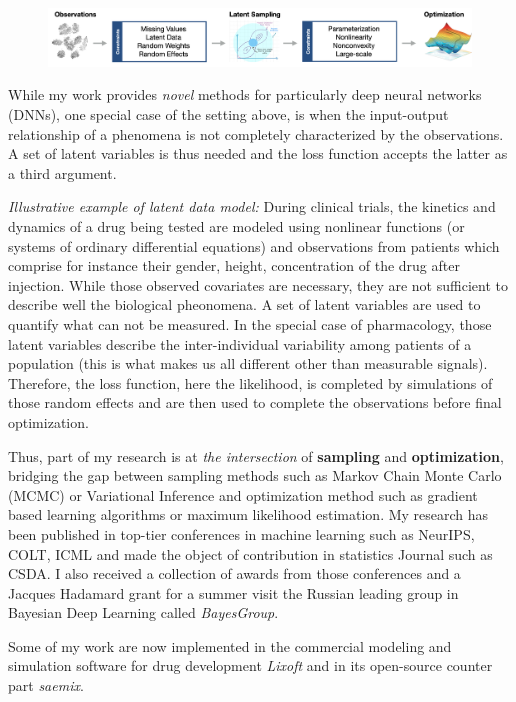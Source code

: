 \documentclass[twoside,11pt]{article}
\begin{document}
\begin{figure}[h]
\centering
\includegraphics[width=\textwidth]{fig}
\end{figure}

While my work provides \emph{novel} methods for particularly deep neural networks (DNNs), one special case of the setting above, is when the input-output relationship of a phenomena is not completely characterized by the observations.
A set of latent variables is thus needed and the loss function accepts the latter as a third argument.

\textit{ Illustrative example of latent data model:} 
During clinical trials, the kinetics and dynamics of a drug being tested are modeled using nonlinear functions (or systems of ordinary differential equations) and observations from patients which comprise for instance their gender, height, concentration of the drug after injection.
While those observed covariates are necessary, they are not sufficient to describe well the biological pheonomena. 
A set of latent variables are used to quantify what can not be measured. 
In the special case of pharmacology, those latent variables describe the inter-individual variability among patients of a population (this is what makes us all different other than measurable signals). 
Therefore, the loss function, here the likelihood, is completed by simulations of those random effects and are then used to complete the observations before final optimization.

Thus, part of my research is at \emph{the intersection} of \textbf{sampling} and \textbf{optimization}, bridging the gap between sampling methods such as Markov Chain Monte Carlo (MCMC) or Variational Inference and optimization method such as gradient based learning algorithms or maximum likelihood estimation.
My research has been published in top-tier conferences in machine learning such as NeurIPS, COLT, ICML and made the object of contribution in statistics Journal such as CSDA. I also received a collection of awards from those conferences and a Jacques Hadamard grant for a summer visit the Russian leading group in Bayesian Deep Learning called \emph{BayesGroup}.

Some of my work are now implemented in the commercial modeling and simulation software for drug development \emph{Lixoft} and in its open-source counter part \emph{saemix}.
\end{document}
